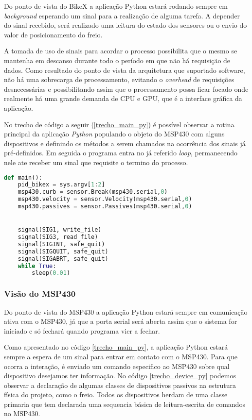 Do ponto de vista do BikeX a aplicação Python estará rodando sempre em \textit{background} esperando um sinal para a realização de alguma tarefa. A depender do sinal recebido, será realizado uma leitura do estado dos sensores ou o envio do valor de posicionamento do freio.

A tomada de uso de sinais para acordar o processo possibilita que o mesmo se mantenha em descanso durante todo o período em que não há requisição de dados. Como resultado do ponto de vista da arquitetura que suportado software, não há uma sobrecarga de processamento, evitando o \textit{overhead} de requisições desnecessárias e possibilitando assim que o processamento possa ficar focado onde realmente há uma grande demanda de CPU e GPU, que é a interface gráfica da aplicação.

No trecho de código a seguir (\ref{trecho_main_py}) é possível observar a rotina principal da aplicação \textit{Python} populando o objeto do MSP430 com alguns dispositivos e definindo os métodos a serem chamados na ocorrência dos sinais já pré-definidos. Em seguida o programa entra no já referido \textit{loop}, permanecendo nele ate receber um sinal que requisite o termino do processo.

\begin{lstlisting}[language=Python,caption={Trecho da rotina principal do script Python},label=trecho_main_py]
def main():
    pid_bikex = sys.argv[1:2]
    msp430.curb = sensor.Break(msp430.serial,0)
    msp430.velocity = sensor.Velocity(msp430.serial,0)
    msp430.passives = sensor.Passives(msp430.serial,0)


    signal(SIG1, write_file)
    signal(SIG3, read_file)
    signal(SIGINT, safe_quit)
    signal(SIGQUIT, safe_quit)
    signal(SIGABRT, safe_quit)
    while True:
        sleep(0.01)

\end{lstlisting}


\subsubsection{Visão do MSP430} %
\label{sub:vis_o_do_msp430}

Do ponto de vista do MSP430 a aplicação Python estará sempre em comunicação ativa com o MSP430, já que a porta serial será aberta assim que o sistema for iniciado e só fechará quando programa vier a fechar.

Como apresentado no código \ref{trecho_main_py}, a aplicação Python estará sempre a espera de um sinal para entrar em contato com o MSP430. Para que ocorra a interação, é enviado um comando especifico ao MSP430 sobre qual dispositivo desejamos ter informação. No código \ref{trecho_device_py} podemos observar a declaração de algumas classes de dispositivos passivos na estrutura física do projeto, como o freio. Todos os dispositivos herdam de uma classe primaria que tem declarada uma sequencia básica de leitura-escrita de comandos no MSP430.


